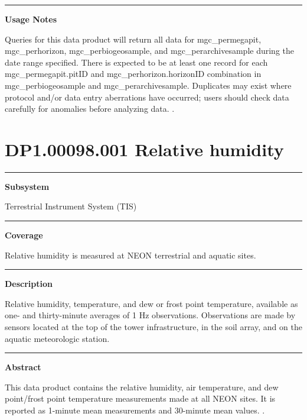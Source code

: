 \documentclass[]{article}
\begin{document}
\begin{center}\rule{0.5\linewidth}{\linethickness}\end{center}

\textbf{Usage Notes}

Queries for this data product will return all data for mgc\_permegapit,
mgc\_perhorizon, mgc\_perbiogeosample, and mgc\_perarchivesample during
the date range specified. There is expected to be at least one record
for each mgc\_permegapit.pitID and mgc\_perhorizon.horizonID combination
in mgc\_perbiogeosample and mgc\_perarchivesample. Duplicates may exist
where protocol and/or data entry aberrations have occurred; users should
check data carefully for anomalies before analyzing data. \newpage
.

\section{DP1.00098.001 Relative
humidity}\label{dp1.00098.001-relative-humidity}

\begin{center}\rule{0.5\linewidth}{\linethickness}\end{center}

\textbf{Subsystem}

Terrestrial Instrument System (TIS)

\begin{center}\rule{0.5\linewidth}{\linethickness}\end{center}

\textbf{Coverage}

Relative humidity is measured at NEON terrestrial and aquatic sites.

\begin{center}\rule{0.5\linewidth}{\linethickness}\end{center}

\textbf{Description}

Relative humidity, temperature, and dew or frost point temperature,
available as one- and thirty-minute averages of 1 Hz observations.
Observations are made by sensors located at the top of the tower
infrastructure, in the soil array, and on the aquatic meteorologic
station.

\begin{center}\rule{0.5\linewidth}{\linethickness}\end{center}

\textbf{Abstract}

This data product contains the relative humidity, air temperature, and
dew point/frost point temperature measurements made at all NEON sites.
It is reported as 1-minute mean measurements and 30-minute mean values.
\newpage
.
\end{document}
